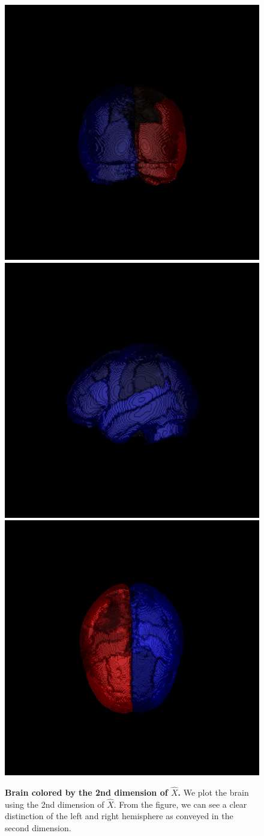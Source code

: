 \documentclass[10pt,letterpaper]{article}
\renewcommand{\hat}{\widehat}
\begin{document}
\begin{figure}[!htbp]
\begin{center}
  \includegraphics[height=.4\linewidth]{desikan2.png}\hspace{-40pt}
  \includegraphics[height=.4\linewidth]{desikan0.png}\hspace{-40pt}
  \includegraphics[height=.4\linewidth]{desikan.png}
\end{center}
\caption{{\bf Brain colored by the 2nd dimension of $\hat{X}$.}
We plot the brain using the 2nd dimension of $\hat{X}$. From the figure, we can see a clear distinction of the left and right hemisphere as conveyed in the second dimension.}
\label{fig:eigenvector_brain}
\end{figure}


\end{document}
